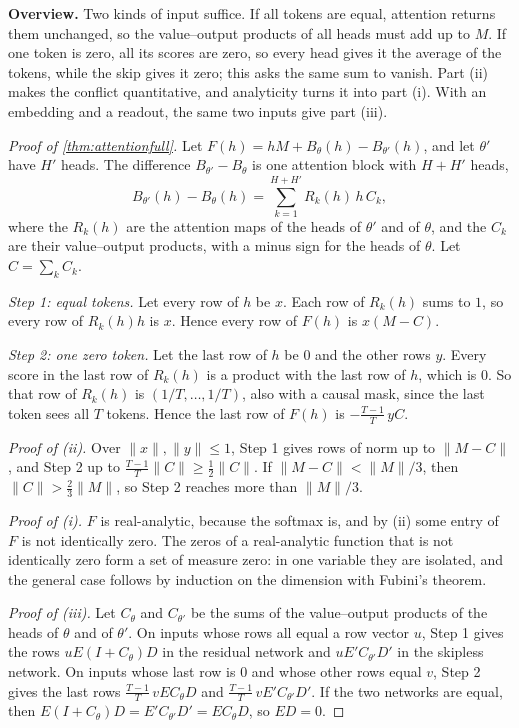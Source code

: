 \documentclass[10pt]{article}
\theoremstyle{definition}
\theoremstyle{remark}
\newcommand{\norm}[1]{\lVert #1\rVert}
\newcommand{\para}[1]{\smallskip\noindent\textbf{#1}\hspace{0.5em}}
\begin{document}
\para{Overview.} Two kinds of input suffice. If all tokens are equal, attention returns them unchanged, so the value--output products of all heads must add up to $M$. If one token is zero, all its scores are zero, so every head gives it the average of the tokens, while the skip gives it zero; this asks the same sum to vanish. Part (ii) makes the conflict quantitative, and analyticity turns it into part (i). With an embedding and a readout, the same two inputs give part (iii).

\begin{proof}[Proof of \cref{thm:attentionfull}]
Let $F(h) = hM + B_\theta(h) - B_{\theta'}(h)$, and let $\theta'$ have $H'$ heads. The difference $B_{\theta'} - B_\theta$ is one attention block with $H + H'$ heads,
\[
B_{\theta'}(h) - B_\theta(h) = \sum_{k=1}^{H+H'} R_k(h)\, h\, C_k,
\]
where the $R_k(h)$ are the attention maps of the heads of $\theta'$ and of $\theta$, and the $C_k$ are their value--output products, with a minus sign for the heads of $\theta$. Let $C = \sum_k C_k$.

\emph{Step 1: equal tokens.} Let every row of $h$ be $x$. Each row of $R_k(h)$ sums to $1$, so every row of $R_k(h)h$ is $x$. Hence every row of $F(h)$ is $x(M - C)$.

\emph{Step 2: one zero token.} Let the last row of $h$ be $0$ and the other rows $y$. Every score in the last row of $R_k(h)$ is a product with the last row of $h$, which is $0$. So that row of $R_k(h)$ is $(1/T, \dots, 1/T)$, also with a causal mask, since the last token sees all $T$ tokens. Hence the last row of $F(h)$ is $-\frac{T-1}{T}\,yC$.

\emph{Proof of (ii).} Over $\norm{x}, \norm{y} \le 1$, Step 1 gives rows of norm up to $\norm{M - C}$, and Step 2 up to $\frac{T-1}{T}\norm{C} \ge \frac12\norm{C}$. If $\norm{M - C} < \norm{M}/3$, then $\norm{C} > \frac23\norm{M}$, so Step 2 reaches more than $\norm{M}/3$.

\emph{Proof of (i).} $F$ is real-analytic, because the softmax is, and by (ii) some entry of $F$ is not identically zero. The zeros of a real-analytic function that is not identically zero form a set of measure zero: in one variable they are isolated, and the general case follows by induction on the dimension with Fubini's theorem.

\emph{Proof of (iii).} Let $C_\theta$ and $C_{\theta'}$ be the sums of the value--output products of the heads of $\theta$ and of $\theta'$. On inputs whose rows all equal a row vector $u$, Step 1 gives the rows $uE(I + C_\theta)D$ in the residual network and $uE'C_{\theta'}D'$ in the skipless network. On inputs whose last row is $0$ and whose other rows equal $v$, Step 2 gives the last rows $\frac{T-1}{T}\,vEC_\theta D$ and $\frac{T-1}{T}\,vE'C_{\theta'}D'$. If the two networks are equal, then $E(I + C_\theta)D = E'C_{\theta'}D' = EC_\theta D$, so $ED = 0$.
\end{proof}
\end{document}
